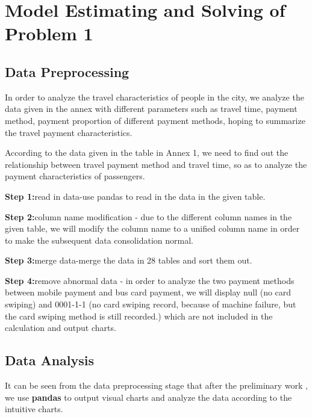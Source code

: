\documentclass[../mcmpaper]{subfiles}
\begin{document}
\section{Model Estimating and Solving of Problem 1 }
\subsection{Data Preprocessing}
In order to analyze the travel characteristics of people in the city, we analyze the data given in the annex with different parameters such as travel time, payment method, payment proportion of different payment methods, hoping to summarize the travel payment characteristics.
\par
According to the data given in the table in Annex 1, we need to find out the relationship between travel payment method and travel time, so as to analyze the payment characteristics of passengers.
\par
\textbf{Step 1:}\space read in data-use pandas to read in the data in the given table.
\par
\textbf{Step 2:}\space column name modification - due to the different column names in the given table, we will modify the column name to a unified column name in order to make the subsequent data consolidation normal.
\par
\textbf{Step 3:}\space merge data-merge the data in 28 tables and sort them out.
\par
\textbf{Step 4:}\space remove abnormal data - in order to analyze the two payment methods between mobile payment and bus card payment, we will display null (no card swiping) and 0001-1-1 (no card swiping record, because of machine failure, but the card swiping method is still recorded.) which are not included in the calculation and output charts. 
\subsection{Data Analysis}
It can be seen from the data preprocessing stage that after the preliminary work , we use \textbf{pandas} to output visual charts and analyze the data according to the intuitive charts.
\end{document}
